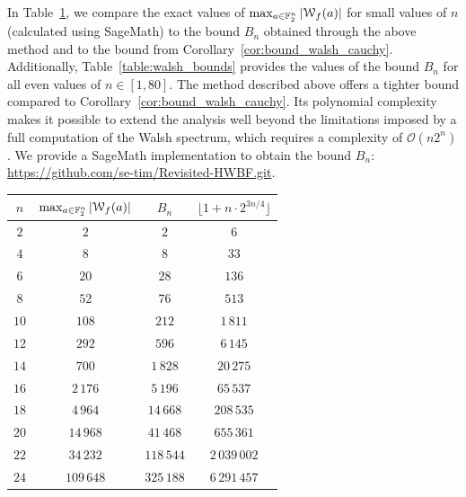 \documentclass{llncs}
\begin{document}
\bigskip

In Table~\ref{table:max_walsh_vs_bound}, we compare the exact values of $\max_{a\in\mathbb F_2^n}|\mathcal W_{f}(a)|$ for small values of $n$ (calculated using \textsf{SageMath}) to the bound $B_n$ obtained through the above method and to the bound from Corollary~\ref{cor:bound_walsh_cauchy}. Additionally, Table~\ref{table:walsh_bounds} provides the values of the bound $B_n$ for all even values of $n\in[1,80]$. The method described above offers a tighter bound compared to Corollary~\ref{cor:bound_walsh_cauchy}. Its polynomial complexity makes it possible to extend the analysis well beyond the limitations imposed by a full computation of the Walsh spectrum, which requires a complexity of $\mathcal O(n2^n)$.
\ifnum{}
	We provide a \textsf{SageMath} implementation to obtain the bound $B_n$: \url{https://github.com/se-tim/Revisited-HWBF.git}.
\fi

\begin{table}
	\scriptsize
	\centering
	\begin{tabular}{|c|c|c|c|}
		\hline
		$n$ & $\max_{a\in\mathbb{F}_2^n}|\mathcal W_{f}(a)|$ & $B_n$  & $\lfloor 1+n \cdot 2^{3n/4} \rfloor$\\
		\hline
		$2$  & $2$     & $2$  &  $6$ \\
		$4$  & $8$     & $8$  & $33$  \\
		$6$  & $20$    & $28$   & $136$\\
		$8$  & $52$    & $76$  & $513$ \\
		$10$ & $108$   & $212$  & $1\,811$\\
		$12$ & $292$   & $596$  & $6\,145$ \\
		$14$ & $700$   & $1\,828$ & $20\,275$ \\
		$16$ & $2\,176$  & $5\,196$ & $65\,537$ \\
		$18$ & $4\,964$  & $14\,668$ & $208\,535$ \\
		$20$ & $14\,968$ & $41\,468$ & $655\,361$ \\
		$22$ & $34\,232$ & $118\,544$ & $2\,039 \,002$ \\
		$24$ & $109\,648$ & $325\,188$ & $6\,291 \,457$  \\
		\hline
	\end{tabular}
	\label{table:max_walsh_vs_bound}
\end{table}
\end{document}
